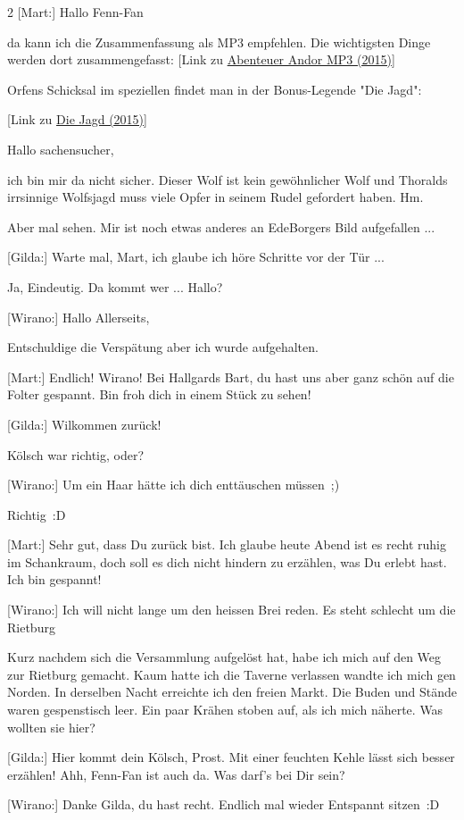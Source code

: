 \documentclass[10pt, a4paper, oneside]{book}
\newcommand{\reflegende}[1]{\hyperref[Legende: #1]{#1}}
\newcommand{\refstorytext}[1]{\hyperref[Storytext: #1]{#1}}
\begin{document}
\begin{multicols}{2}
[Mart:] Hallo Fenn-Fan

da kann ich die Zusammenfassung als MP3 empfehlen. Die wichtigsten Dinge werden dort zusammengefasst: [Link zu \refstorytext{Abenteuer Andor MP3 (2015)}]

Orfens Schicksal im speziellen findet man in der Bonus-Legende "Die Jagd":

[Link zu \reflegende{Die Jagd (2015)}]


Hallo sachensucher,

ich bin mir da nicht sicher. Dieser Wolf ist kein gewöhnlicher Wolf und Thoralds irrsinnige Wolfsjagd muss viele Opfer in seinem Rudel gefordert haben. Hm.

Aber mal sehen. Mir ist noch etwas anderes an EdeBorgers Bild aufgefallen ...

[Gilda:] Warte mal, Mart, ich glaube ich höre Schritte vor der Tür ...

Ja, Eindeutig. Da kommt wer ... Hallo?

[Wirano:] Hallo Allerseits,

Entschuldige die Verspätung aber ich wurde aufgehalten.

[Mart:] Endlich! Wirano! Bei Hallgards Bart, du hast uns aber ganz schön auf die Folter gespannt. Bin froh dich in einem Stück zu sehen!

[Gilda:] Wilkommen zurück!

Kölsch war richtig, oder?

[Wirano:] Um ein Haar hätte ich dich enttäuschen müssen ;)

Richtig :D

[Mart:] Sehr gut, dass Du zurück bist. Ich glaube heute Abend ist es recht ruhig im Schankraum, doch soll es dich nicht hindern zu erzählen, was Du erlebt hast. Ich bin gespannt!

[Wirano:] Ich will nicht lange um den heissen Brei reden. Es steht schlecht um die Rietburg

Kurz nachdem sich die Versammlung aufgelöst hat, habe ich mich auf den Weg zur Rietburg gemacht. Kaum hatte ich die Taverne verlassen wandte ich mich gen Norden. In derselben Nacht erreichte ich den freien Markt. Die Buden und Stände waren gespenstisch leer. Ein paar Krähen stoben auf, als ich mich näherte. Was wollten sie hier?

[Gilda:] Hier kommt dein Kölsch, Prost. Mit einer feuchten Kehle lässt sich besser erzählen!
Ahh, Fenn-Fan ist auch da. Was darf's bei Dir sein?

[Wirano:] Danke Gilda, du hast recht. Endlich mal wieder Entspannt sitzen :D


\end{multicols}
\end{document}

